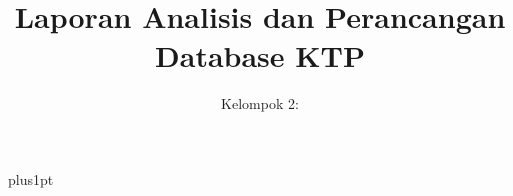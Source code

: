 \documentclass[12pt]{ociamthesis}
\title{Laporan Analisis dan Perancangan Database KTP\\[1ex]  }
\author{ Kelompok 2:\\[2ex] }
\begin{document}
\baselineskip=18pt plus1pt

\setcounter{secnumdepth}{3}
\setcounter{tocdepth}{3}


\maketitle

\begin{romanpages}
\tableofcontents
\listoffigures
\end{romanpages}




\end{document}
